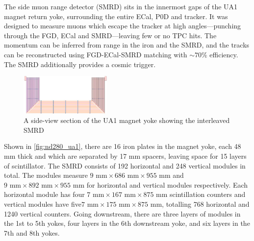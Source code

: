 The side muon range detector (SMRD)\cite{t2k_smrd} sits in the innermost gaps of the UA1 magnet return yoke, surrounding the entire ECal, P0D and tracker. It was designed to measure muons which escape the tracker at high angles---punching through the FGD, ECal and SMRD---leaving few or no TPC hits. The momentum can be inferred from range in the iron and the SMRD, and the tracks can be reconstructed using FGD-ECal-SMRD matching with $\sim70\%$ efficiency. The SMRD additionally provides a cosmic trigger.
\begin{figure}[h]
	\includegraphics[width=0.4\textwidth, trim={0mm 0mm 0mm 0mm}, clip,page=1]{figures/det_chap/smrd/ua1_smrd}
	\caption{A side-view section of the UA1 magnet yoke showing the interleaved SMRD}
	\label{fig:nd280_ua1}
\end{figure}

Shown in \autoref{fig:nd280_ua1}, there are 16 iron plates in the magnet yoke, each 48 mm thick and which are separated by 17 mm spacers, leaving space for 15 layers of scintillator. The SMRD consists of 192 horizontal and 248 vertical modules in total. The modules measure $9\text{ mm}\times686\text{ mm}\times955\text{ mm}$ and $9\text{ mm}\times892\text{ mm}\times955\text{ mm}$ for horizontal and vertical modules respectively. Each horizontal module has four $7\text{ mm}\times167\text{ mm}\times875\text{ mm}$ scintillation counters and vertical modules have five\newline $7\text{ mm}\times175\text{ mm}\times875\text{ mm}$, totalling 768 horizontal and 1240 vertical counters. Going downstream, there are three layers of modules in the 1st to 5th yokes, four layers in the 6th downstream yoke, and six layers in the 7th and 8th yokes.

